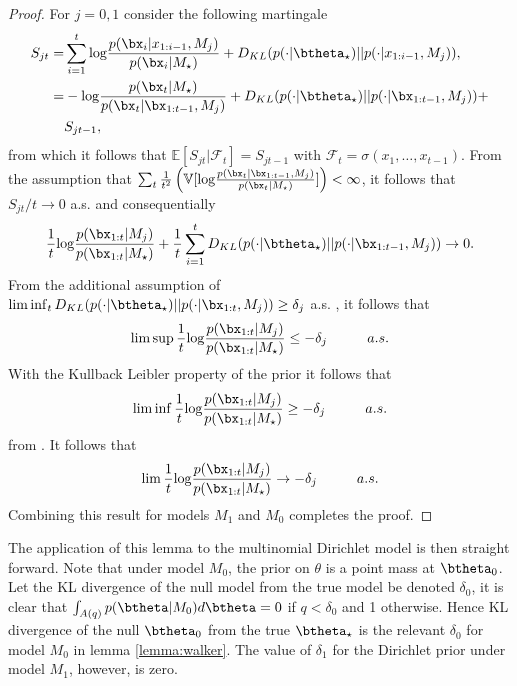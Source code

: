 \documentclass[11pt]{article}
\def\log{{\rm log}}
\begin{document}
\begin{proof}
  For $j=0,1$ consider the following martingale
  \begin{align*}
    \label{eq:walker_martingale}
    S_{jt} =& \sum_{i=1}^{t} \log \frac{p(\bx_i|x_{1:i-1},M_j)}{p(\bx_i|M_\star)} + D_{KL}(p(\cdot|\btheta_\star)||p(\cdot|x_{1:i-1}, M_j) ),\\
    =& -\log \frac{p(\bx_t|M_\star)}{p(\bx_t|\bx_{1:t-1},M_j)} + D_{KL}(p(\cdot|\btheta_\star)||p(\cdot|\bx_{1:t-1}, M_j) ) +\\
    &S_{jt-1},\\
  \end{align*}
  from which it follows that $\mathbb{E}[S_{jt}|\mathcal{F}_t] = S_{jt-1}$ with $\mathcal{F}_t = \sigma(x_1,\dots,x_{t-1})$.
From the assumption that  $\sum_t \frac{1}{t^2} \left( \mathbb{V}[\log \frac{p(\bx_t|\bx_{1:t-1},M_j)}{p(\bx_t|M_\star )}]\right) < \infty$, it follows that $S_{jt}/t \rightarrow 0$ a.s.
and consequentially
  \begin{align*}
    \frac{1}{t} \log \frac{p(\bx_{1:t}|M_j)}{p(\bx_{1:t}|M_\star)} + \frac{1}{t}\sum_{i=1}^t  D_{KL}(p(\cdot|\btheta_\star)||p(\cdot|\bx_{1:t-1}, M_j) )\rightarrow 0.
  \end{align*}
  From the additional assumption of $\lim \inf_t D_{KL}(p(\cdot|\btheta_\star)||p(\cdot|\bx_{1:t}, M_j) ) \geq \delta_j$ a.s.
, it follows that
  \begin{align*}
    \lim \sup   \frac{1}{t} \log \frac{p(\bx_{1:t}|M_j)}{p(\bx_{1:t}|M_\star)} \leq - \delta_j \hspace{1cm} a.s.
  \end{align*}
  With the Kullback Leibler property of the prior it follows that
  \begin{align*}
     \lim \inf   \frac{1}{t} \log \frac{p(\bx_{1:t}|M_j)}{p(\bx_{1:t}|M_\star)} \geq - \delta_j \hspace{1cm} a.s.
  \end{align*}
  from \cite{barron}.
It follows that
    \begin{align*}
     \lim   \frac{1}{t} \log \frac{p(\bx_{1:t}|M_j)}{p(\bx_{1:t}|M_\star)} \rightarrow - \delta_j \hspace{1cm} a.s.
    \end{align*}
    Combining this result for models $M_1$ and $M_0$ completes the proof.
\end{proof}

The application of this lemma to the multinomial Dirichlet model is then straight forward.
Note that under model $M_0$, the prior on $\theta$ is a point mass at $\btheta_0$.
Let the KL divergence of the null model from the true model be denoted $\delta_0$, it is clear that $\int_{A(q)} p(\btheta|M_0) d\btheta = 0$ if $q<\delta_0$ and 1 otherwise.
Hence KL divergence of the null $\btheta_0$ from the true $\btheta_\star$ is the relevant $\delta_0$ for model $M_0$ in lemma \ref{lemma:walker}.
The value of $\delta_1$ for the Dirichlet prior under model $M_1$, however, is zero.
\end{document}
